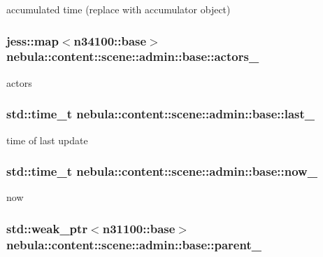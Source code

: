 accumulated time (replace with accumulator object) \hypertarget{classnebula_1_1content_1_1scene_1_1admin_1_1base_a9c2acfbf96900cd6d057cb6dbe548c3e}{
\subsubsection[{actors\_\-}]{\setlength{\rightskip}{0pt plus 5cm}jess::map$<${\bf n34100::base}$>$ {\bf nebula::content::scene::admin::base::actors\_\-}}}
\label{classnebula_1_1content_1_1scene_1_1admin_1_1base_a9c2acfbf96900cd6d057cb6dbe548c3e}


actors \hypertarget{classnebula_1_1content_1_1scene_1_1admin_1_1base_a1a951e1694ac47330dd9869a27ded37b}{
\subsubsection[{last\_\-}]{\setlength{\rightskip}{0pt plus 5cm}std::time\_\-t {\bf nebula::content::scene::admin::base::last\_\-}}}
\label{classnebula_1_1content_1_1scene_1_1admin_1_1base_a1a951e1694ac47330dd9869a27ded37b}


time of last update \hypertarget{classnebula_1_1content_1_1scene_1_1admin_1_1base_a58370706ad19666ed6d1bf43ad7d2dce}{
\subsubsection[{now\_\-}]{\setlength{\rightskip}{0pt plus 5cm}std::time\_\-t {\bf nebula::content::scene::admin::base::now\_\-}}}
\label{classnebula_1_1content_1_1scene_1_1admin_1_1base_a58370706ad19666ed6d1bf43ad7d2dce}


now \hypertarget{classnebula_1_1content_1_1scene_1_1admin_1_1base_a91e57c35622d576b5a454f406a425c61}{
\subsubsection[{parent\_\-}]{\setlength{\rightskip}{0pt plus 5cm}std::weak\_\-ptr$<${\bf n31100::base}$>$ {\bf nebula::content::scene::admin::base::parent\_\-}}}
\label{classnebula_1_1content_1_1scene_1_1admin_1_1base_a91e57c35622d576b5a454f406a425c61}


